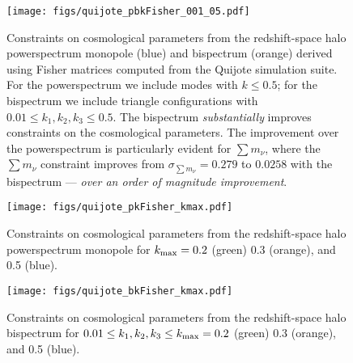 \documentclass[12pt, letterpaper, preprint]{aastex62}
\newcommand{\smnu}{\sum m_\nu}
\begin{document}
\begin{figure}
\begin{center}
    \texttt{[image: figs/quijote\_pbkFisher\_001\_05.pdf]}
    \caption{Constraints on cosmological parameters from the redshift-space halo 
    powerspectrum monopole (blue) and bispectrum (orange) derived using Fisher 
    matrices computed from the Quijote simulation suite. For the powerspectrum 
    we include modes with $k \leq 0.5$; for the bispectrum we include triangle 
    configurations with $0.01 \leq k_1, k_2, k_3 \leq 0.5$. The bispectrum 
    {\em substantially} improves constraints on the cosmological parameters. 
    The improvement over the powerspectrum is particularly evident for $\smnu$, 
    where the $\smnu$ constraint improves from $\sigma_{\smnu} = 0.279$ to 
    $0.0258$ with the bispectrum --- {\em over an order of magnitude improvement}.}
\label{fig:bk_fish}
\end{center}
\end{figure}


\begin{figure}
\begin{center}
    \texttt{[image: figs/quijote\_pkFisher\_kmax.pdf]} 
    \caption{Constraints on cosmological parameters from the redshift-space
    halo powerspectrum monopole for $k_{\rm max} = 0.2$ (green) 0.3 (orange), 
    and 0.5 (blue).}
\label{fig:pk_fish_kmax}
\end{center}
\end{figure}


\begin{figure}
\begin{center}
    \texttt{[image: figs/quijote\_bkFisher\_kmax.pdf]} 
    \caption{Constraints on cosmological parameters from the redshift-space
    halo bispectrum for $0.01 \leq k_1, k_2, k_3 \leq k_{\rm max} = 0.2$ (green) 0.3 (orange), 
    and 0.5 (blue).}
\label{fig:bk_fish_kmax}
\end{center}
\end{figure}
\end{document}
